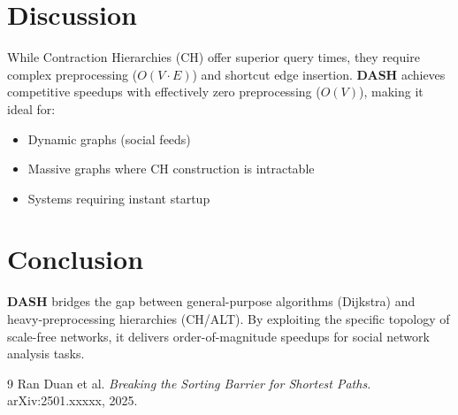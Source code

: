 \documentclass[10pt,twocolumn,letterpaper]{article}
\newcommand{\dash}{\textbf{DASH}}
\begin{document}
\section{Discussion}

While Contraction Hierarchies (CH) offer superior query times, they require complex preprocessing ($O(V \cdot E)$) and shortcut edge insertion. \dash{} achieves competitive speedups with effectively zero preprocessing ($O(V)$), making it ideal for:

\begin{itemize}
    \item Dynamic graphs (social feeds)
    \item Massive graphs where CH construction is intractable
    \item Systems requiring instant startup
\end{itemize}

\section{Conclusion}

\dash{} bridges the gap between general-purpose algorithms (Dijkstra) and heavy-preprocessing hierarchies (CH/ALT). By exploiting the specific topology of scale-free networks, it delivers order-of-magnitude speedups for social network analysis tasks.

\begin{thebibliography}{9}
Ran Duan et al.
\textit{Breaking the Sorting Barrier for Shortest Paths}.
arXiv:2501.xxxxx, 2025.
\end{thebibliography}
\end{document}
